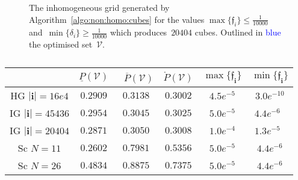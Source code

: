 \documentclass[letterpaper, 10pt, conference]{ieeeconf} %
\providecommand{\abs}[1]{\left\lvert#1\right\rvert}
\providecommand{\bfa}[1]{\mathbf{#1}}
\begin{document}
%
%
%
%
%
\begin{figure}\centering
{}

\fi
\caption{The inhomogeneous grid generated by Algorithm~\ref{algo:non:homo:cubes} for the values $\max\{\mathfrak{f}_i\}\leq\frac{1}{10000}$ and~$\min\{\delta_i\}\geq\frac{1}{10000}$ which produces~$20404$ cubes.
%
Outlined in \textcolor{blue}{blue} the optimised set~$\mathcal V$.}
\label{fig:inhomogeneous:grid}
\end{figure}
%
%
\begin{table}
\begin{tabular}{|c|c|c|c|c|c|}
\hline
& $\underline{P}(\mathcal V)$ & $\overline{P}(\mathcal V)$ & $\mathring{P}(\mathcal V)$ & $\max\{\mathfrak{f}_{\bfa{i}}\}$ & $\min\{\mathfrak{f}_\bfa{i}\}$\\
\hline HG $\abs{\bfa{i}}=16e4$ & $0.2909$ & $0.3138$ & $0.3002$ & $4.5e^{-5}$ & $3.0e^{-10}$ \\
\hline IG $\abs{\bfa{i}}=45436$ & $0.2954$ & $0.3045$ & $0.3025$ & $5.0e^{-5}$ & $4.4e^{-6}$ \\
\hline IG $\abs{\bfa{i}}=20404$ & $0.2871$ & $0.3050$ & $0.3008$ & $1.0e^{-4}$ & $1.3e^{-5}$ \\
\hline Sc $N=11$ & $0.2602$ & $0.7981$ & $0.5356$ & $5.0e^{-5}$ & $4.4e^{-6}$ \\ 
\hline Sc $N=26$ & $0.4834$ & $0.8875$ & $0.7375$ & $5.0e^{-5}$ & $4.4e^{-6}$ \\
\hline 
\end{tabular}
\caption{}
\label{tab:only:table}
\end{table}
\end{document}
